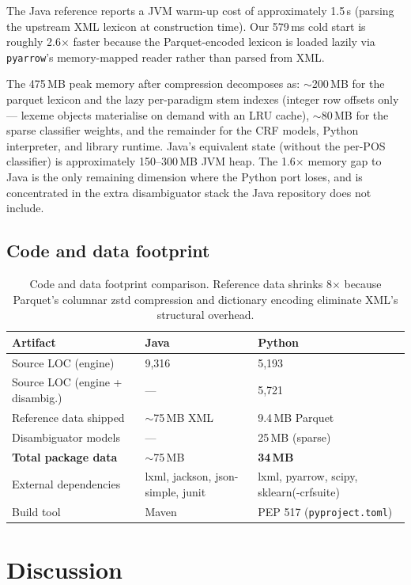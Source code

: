 \documentclass[11pt,a4paper]{article}
\begin{document}
The Java reference reports a JVM warm-up cost of approximately 1.5\,s
(parsing the upstream XML lexicon at construction time). Our 579\,ms cold
start is roughly 2.6$\times$ faster because the Parquet-encoded lexicon is
loaded lazily via \texttt{pyarrow}'s memory-mapped reader rather than parsed
from XML.

The 475\,MB peak memory after compression decomposes as:
$\sim$200\,MB for the parquet lexicon and the lazy per-paradigm stem indexes
(integer row offsets only --- lexeme objects materialise on demand with an
LRU cache), $\sim$80\,MB for the sparse classifier weights, and the
remainder for the CRF models, Python interpreter, and library runtime.
Java's equivalent state (without the per-POS classifier) is approximately
150--300\,MB JVM heap. The 1.6$\times$ memory gap to Java is the only
remaining dimension where the Python port loses, and is concentrated in the
extra disambiguator stack the Java repository does not include.

\subsection{Code and data footprint}

\begin{table}[h]
\centering
\small
\begin{tabular}{lp{4.0cm}p{5.5cm}}
\toprule
\textbf{Artifact} & \textbf{Java} & \textbf{Python} \\
\midrule
Source LOC (engine) & 9{,}316 & 5{,}193 \\
Source LOC (engine + disambig.) & --- & 5{,}721 \\
Reference data shipped & $\sim$75\,MB XML & 9.4\,MB Parquet \\
Disambiguator models & --- & 25\,MB (sparse) \\
\textbf{Total package data} & $\sim$75\,MB & \textbf{34\,MB} \\
External dependencies & lxml, jackson, json-simple, junit & lxml, pyarrow, scipy, sklearn(-crfsuite) \\
Build tool & Maven & PEP 517 (\texttt{pyproject.toml}) \\
\bottomrule
\end{tabular}
\caption{Code and data footprint comparison. Reference data shrinks 8$\times$
because Parquet's columnar zstd compression and dictionary encoding eliminate
XML's structural overhead.}
\label{tab:footprint}
\end{table}

\section{Discussion}
\end{document}
